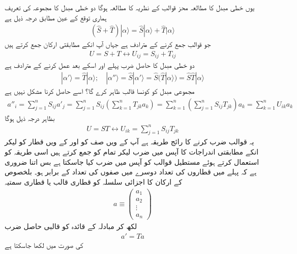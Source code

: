 یوں خطی مبدل کا مطالعہ محز قوالب کے نظریہ کا مطالعہ ہوگا دو خطی مبدل کا مجموعہ  کی تعریف ہماری توقع کے عین مطابق درجہ ذیل ہے
\begin{align}
	(\hat{S}+\hat{T})|\alpha\rangle=\hat{S}|\alpha\rangle+\hat{T}|\alpha\rangle
\end{align}
جو قوالب جمع کرنے کے مترادف ہے جہاں آپ انکے مطابقتی ارکان جمع کرتے ہیں
\begin{align}
	U = S+T \leftrightarrow U_{ij}=S_{ij}+T_{ij}
\end{align}
دو خطی مبدل کا حاصل ضرب  پہلے  اور اسکے بعد  عمل کرنے کے مترادف ہے
\begin{align}
	|\alpha'\rangle=\hat{T}|\alpha\rangle;\quad|\alpha''\rangle=\hat{S}|\alpha'\rangle=\hat{S}(\hat{T}|\alpha\rangle)=\hat{S}\hat{T}|\alpha\rangle
\end{align}
مجموعی مبدل  کو کونسا قالب  ظاہر کرے گا؟ اسے حاصل کرنا مشکل نہیں ہے
\begin{align*}
	a''_i=\sum_{j=1}^{n}S_{ij}a'_j=\sum_{j=1}^{n}S_{ij}\left(\sum_{k=1}^{n}T_{jk}a_k\right)=\sum_{k=1}^{n}\left(\sum_{j=1}^{n}S_{ij}T_{jk}\right)a_k=\sum_{k=1}^{n}U_{ik}a_k
\end{align*}
بظاہر درجہ ذیل ہوگا
\begin{align}
	U = ST\leftrightarrow U_{ik}=\sum_{j=1}^{n}S_{ij}T_{jk}
\end{align}
یہ قوالب ضرب کرنے کا رائج طریقہ ہے آپ  کے ویں صف کو اور  کے ویں قطار کو لیکر انکے مطابقتی اندراجات کا آپس میں ضرب لیکر تمام کو جمع کرتے ہیں اسی طریقہ کو استعمال کرتے ہوئے مستطیل قوالب کو آپس میں ضرب کیا جاسکتا ہے بس اتنا ضروری ہے کہ پہلے میں قطاروں کی تعداد دوسرے میں صفوں کی تعداد کے برابر ہو۔ بلخصوص  کے ارکان کا  اجزائی سلسلہ کو  قطاری قالب یا قطاری سمتیہ
\begin{align}
	a\equiv
	\begin{pmatrix}
		a_1\\a_2\\\vdots\\a_n
	\end{pmatrix}
\end{align}
لکھ کر مبادلہ کے قائدہ کو قالبی حاصل ضرب
\begin{align}
	a'=Ta
\end{align}
کی صورت میں لکھا جاسکتا ہے

